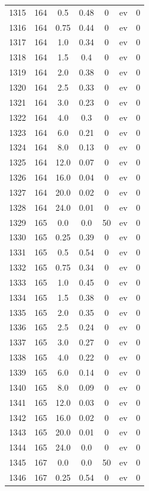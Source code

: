 \documentclass[12pt,a4paper]{article}
\begin{document}
\begin{tabular}{r|cccccc}
	1315 & 164 & 0.5 & 0.48 & 0 & ev & 0 \\
	1316 & 164 & 0.75 & 0.44 & 0 & ev & 0 \\
	1317 & 164 & 1.0 & 0.34 & 0 & ev & 0 \\
	1318 & 164 & 1.5 & 0.4 & 0 & ev & 0 \\
	1319 & 164 & 2.0 & 0.38 & 0 & ev & 0 \\
	1320 & 164 & 2.5 & 0.33 & 0 & ev & 0 \\
	1321 & 164 & 3.0 & 0.23 & 0 & ev & 0 \\
	1322 & 164 & 4.0 & 0.3 & 0 & ev & 0 \\
	1323 & 164 & 6.0 & 0.21 & 0 & ev & 0 \\
	1324 & 164 & 8.0 & 0.13 & 0 & ev & 0 \\
	1325 & 164 & 12.0 & 0.07 & 0 & ev & 0 \\
	1326 & 164 & 16.0 & 0.04 & 0 & ev & 0 \\
	1327 & 164 & 20.0 & 0.02 & 0 & ev & 0 \\
	1328 & 164 & 24.0 & 0.01 & 0 & ev & 0 \\
	1329 & 165 & 0.0 & 0.0 & 50 & ev & 0 \\
	1330 & 165 & 0.25 & 0.39 & 0 & ev & 0 \\
	1331 & 165 & 0.5 & 0.54 & 0 & ev & 0 \\
	1332 & 165 & 0.75 & 0.34 & 0 & ev & 0 \\
	1333 & 165 & 1.0 & 0.45 & 0 & ev & 0 \\
	1334 & 165 & 1.5 & 0.38 & 0 & ev & 0 \\
	1335 & 165 & 2.0 & 0.35 & 0 & ev & 0 \\
	1336 & 165 & 2.5 & 0.24 & 0 & ev & 0 \\
	1337 & 165 & 3.0 & 0.27 & 0 & ev & 0 \\
	1338 & 165 & 4.0 & 0.22 & 0 & ev & 0 \\
	1339 & 165 & 6.0 & 0.14 & 0 & ev & 0 \\
	1340 & 165 & 8.0 & 0.09 & 0 & ev & 0 \\
	1341 & 165 & 12.0 & 0.03 & 0 & ev & 0 \\
	1342 & 165 & 16.0 & 0.02 & 0 & ev & 0 \\
	1343 & 165 & 20.0 & 0.01 & 0 & ev & 0 \\
	1344 & 165 & 24.0 & 0.0 & 0 & ev & 0 \\
	1345 & 167 & 0.0 & 0.0 & 50 & ev & 0 \\
	1346 & 167 & 0.25 & 0.54 & 0 & ev & 0 \\

\end{tabular}
\end{document}
